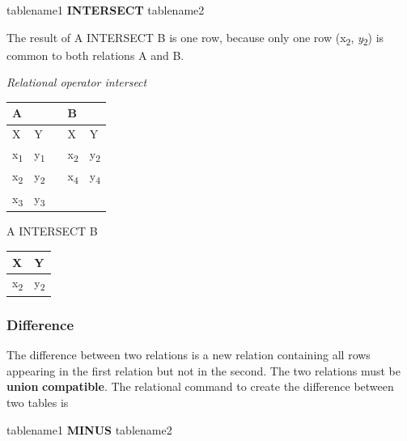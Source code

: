 \documentclass[
]{article}
\newenvironment{Shaded}{\begin{snugshade}}{\end{snugshade}}
\newcommand{\KeywordTok}[1]{\textcolor[rgb]{0.13,0.29,0.53}{\textbf{#1}}}
\newcommand{\NormalTok}[1]{#1}
\begin{document}
\begin{Shaded}
\begin{Highlighting}[]
\NormalTok{tablename1 }\KeywordTok{INTERSECT}\NormalTok{ tablename2}
\end{Highlighting}
\end{Shaded}

The result of A INTERSECT B is one row, because only one row (x\textsubscript{2},
\emph{y}\textsubscript{2}) is common to both relations A and B.

\emph{Relational operator intersect}

\begin{longtable}[]{@{}lllll@{}}
\toprule
A & & & B & \\
\midrule
\endhead
X & Y & & X & Y \\
x\textsubscript{1} & y\textsubscript{1} & & x\textsubscript{2} & y\textsubscript{2} \\
x\textsubscript{2} & y\textsubscript{2} & & x\textsubscript{4} & y\textsubscript{4} \\
x\textsubscript{3} & y\textsubscript{3} & & & \\
\bottomrule
\end{longtable}

A INTERSECT B

\begin{longtable}[]{@{}ll@{}}
\toprule
X & Y \\
\midrule
\endhead
x\textsubscript{2} & y\textsubscript{2} \\
\bottomrule
\end{longtable}

\hypertarget{difference}{%
\subsubsection*{Difference}\label{difference}}

The difference between two relations is a new relation containing all
rows appearing in the first relation but not in the second. The two
relations must be \textbf{union} \textbf{compatible}. The relational command to
create the difference between two tables is

\begin{Shaded}
\begin{Highlighting}[]
\NormalTok{tablename1 }\KeywordTok{MINUS}\NormalTok{ tablename2}
\end{Highlighting}
\end{Shaded}
\end{document}
